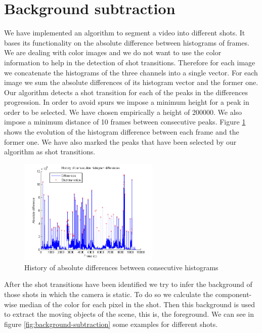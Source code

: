\section{Background subtraction}

We have implemented an algorithm to segment a video into different shots. It bases its functionality on the absolute difference between histograms of frames. We are dealing with color images and we do not want to use the color information to help in the detection of shot transitions. Therefore for each image we concatenate the histograms of the three channels into a single vector. For each image we sum the absolute differences of its histogram vector and the former one. Our algorithm detects a shot transition for each of the peaks in the differences progression. In order to avoid spurs we impose a minimum height for a peak in order to be selected. We have chosen empirically a height of 200000. We also impose a minimum distance of 10 frames between consecutive peaks. Figure \ref{fig:history-differences} shows the evolution of the histogram difference between each frame and the former one. We have also marked the peaks that have been selected by our algorithm as shot transitions.

\begin{figure}[htb]
\centering
\includegraphics[width=0.6\textwidth]{./img/ex1/history-differences.png}
\caption{History of absolute differences between consecutive histograms}
\label{fig:history-differences}
\end{figure}

After the shot transitions have been identified we try to infer the background of those shots in which the camera is static. To do so we calculate the component-wise median of the color for each pixel in the shot. Then this background is used to extract the moving objects of the scene, this is, the foreground. We can see in figure \ref{fig:background-subtraction} some examples for different shots.

